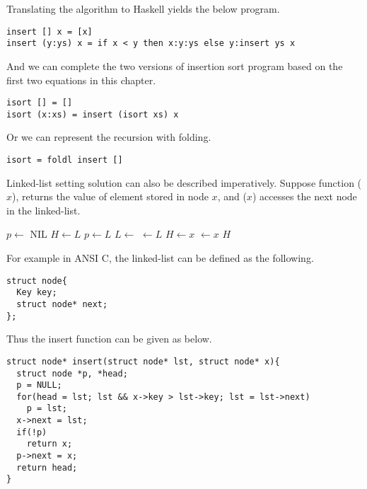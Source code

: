 \documentclass{article}
\begin{document}
Translating the algorithm to Haskell yields the below program.

\lstset{language=Haskell}
\begin{lstlisting}
insert [] x = [x]
insert (y:ys) x = if x < y then x:y:ys else y:insert ys x
\end{lstlisting}

And we can complete the two versions of insertion sort program based on
the first two equations in this chapter.

\begin{lstlisting}
isort [] = []
isort (x:xs) = insert (isort xs) x
\end{lstlisting}

Or we can represent the recursion with folding.

\begin{lstlisting}
isort = foldl insert []
\end{lstlisting}

Linked-list setting solution can also be described imperatively. Suppose
function ($x$), returns the value of element stored in node
$x$, and ($x$) accesses the next node in the linked-list.

\begin{algorithmic}
  \State $p \gets$ NIL
  \State $H \gets L$
    \State $p \gets L$
    \State $L \gets $ 
  \EndWhile
  \State {} $\gets L$
    \State $H \gets x$
  \Else
    \State {} $\gets x$
  \EndIf
  \State \Return $H$
\EndFunction
\end{algorithmic}

For example in ANSI C, the linked-list can be defined as the following.

\lstset{language=C}
\begin{lstlisting}
struct node{
  Key key;
  struct node* next;
};
\end{lstlisting}

Thus the insert function can be given as below.

\begin{lstlisting}
struct node* insert(struct node* lst, struct node* x){
  struct node *p, *head;
  p = NULL;
  for(head = lst; lst && x->key > lst->key; lst = lst->next)
    p = lst;
  x->next = lst;
  if(!p)
    return x;
  p->next = x;
  return head;
}
\end{lstlisting}
\end{document}

